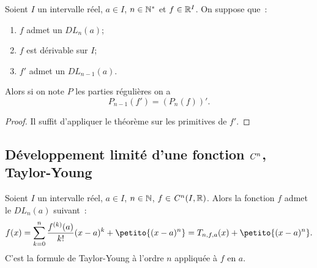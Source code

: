 \begin{prop}
  Soient $I$ un intervalle réel, $a \in I$, $n \in \mathbb{N}^*$ et $f \in \mathbb{R}^I$. On suppose que~:
  \begin{enumerate}
  \item $f$ admet un $DL_n(a)$;
  \item $f$ est dérivable sur $I$;
  \item $f'$ admet un $DL_{n-1}(a)$.
  \end{enumerate}
  Alors si on note $P$ les parties régulières on a
  \begin{equation}
    P_{n-1}(f')=(P_n(f))'.
  \end{equation}
\end{prop}
\begin{proof}
  Il suffit d'appliquer le théorème sur les primitives de $f'$.
\end{proof}

\subsection[Développement limité d'une fonction $\classe{n}$]{Développement limité d'une fonction $\classe{n}$, Taylor-Young}

\begin{theo}
  Soient $I$ un intervalle réel, $a \in I$, $n \in \mathbb{N}$, $f \in \mathit{C}^n(I,\mathbb{R})$. Alors la fonction $f$ admet le $DL_n(a)$ suivant~:
  \begin{equation}
    f(x) = \sum_{k=0}^n \frac{f^{(k)}(a)}{k!} (x-a)^k + \petito{(x-a)^n} = T_{n,f,a}(x)+\petito{(x-a)^n}.
  \end{equation}
  C'est la formule de Taylor-Young à l'ordre $n$ appliquée à $f$ en $a$.
\end{theo}

